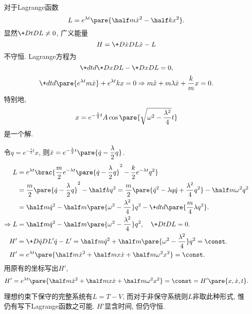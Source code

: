 \documentclass{ctexart}
\begin{document}
\begin{sample}
    \begin{ex}
        对于Lagrange函数
        \[ L = e^{\lambda t}\pare{\half m\dot{x}^2 - \half kx^2}. \]
        显然$\displaystyle \+DtDL \neq 0$, 广义能量
        \[ H = \+D{\dot{x}}DL \dot{x} - L \]
        不守恒. Lagrange方程为
        \[ \+dtd{}\+DxDL - \+DxDL = 0, \]
        \[ \+dtd{}\pare{e^{\lambda t} m\dot{x}} + e^{\lambda t} kx = 0 \Rightarrow m\ddot{x} + m\lambda \dot{x} + \frac{k}{m} x = 0. \]
        特别地,
        \[ x = e^{-\frac{\lambda}{2}t}A\cos\pare{\sqrt{\omega^2 - \frac{\lambda^2}{4}} t} \]
        是一个解.
        \par
        令$\displaystyle q = e^{-\frac{\lambda}{2}t}x$, 则$\displaystyle \dot{x} = e^{-\frac{\lambda}{2}t} \pare{\dot{q} - \frac{\lambda}{2}q}$.
        \begin{align*}
            L &= e^{\lambda t} \brac{\frac{m}{2}e^{-\lambda t} \pare{\dot{q} - \frac{\lambda}{2}q}^2 - \frac{k}{2}e^{-\lambda t}q^2} \\
            &= \frac{m}{2} \pare{\dot{q} - \frac{\lambda}{2}q}^2 - \half k q^2 = \frac{m}{2}\pare{\dot{q}^2 - \lambda q\dot{q} + \frac{\lambda^2}{4}q^2} - \half m\omega^2 q^2 \\
            &= \half m\dot{q}^2 - \half m\pare{\omega^2 - \frac{\lambda^2}{4}}q^2 - \+dtd{} \pare{\frac{m}{4}\lambda q^2}. \\
            \Rightarrow L &=\half m\dot{q}^2 - \half m\pare{\omega^2 - \frac{\lambda^2}{4}}q^2,\quad \+D{t}DL = 0. \\ 
            H' &= \+D{\dot{q}}D{L'} \dot{q} - L' = \half m\dot{q}^2 + \half m\pare{\omega^2 - \frac{\lambda^2}{4}}q^2 = \const. \\
            H' &= e^{\lambda t}\pare{\half m\dot{x}^2 + \half mx\dot{x} + \half m\omega^2 x^2} = \const.
        \end{align*}
        用原有的坐标写出$H'$,
        \[ H' = e^{\lambda t}\pare{\half m\dot{x}^2 + \half mx\dot{x} + \half m\omega^2 x^2} = \const = H'\pare{x,\dot{x},t}. \]
    \end{ex}
    \begin{remark}
        理想约束下保守的完整系统有$L = T - V$, 而对于非保守系统则$L$非取此种形式, 惟仍有写下Lagrange函数之可能. $H'$显含时间, 但仍守恒.
    \end{remark}
\end{sample}


\end{document}
